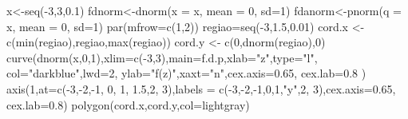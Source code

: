 \documentclass[
  letterpaper,
  DIV=11,
  numbers=noendperiod]{scrartcl}
\newenvironment{Shaded}{\begin{snugshade}}{\end{snugshade}}
\newcommand{\AttributeTok}[1]{\textcolor[rgb]{0.40,0.45,0.13}{#1}}
\newcommand{\DecValTok}[1]{\textcolor[rgb]{0.68,0.00,0.00}{#1}}
\newcommand{\FloatTok}[1]{\textcolor[rgb]{0.68,0.00,0.00}{#1}}
\newcommand{\FunctionTok}[1]{\textcolor[rgb]{0.28,0.35,0.67}{#1}}
\newcommand{\NormalTok}[1]{\textcolor[rgb]{0.00,0.23,0.31}{#1}}
\newcommand{\OtherTok}[1]{\textcolor[rgb]{0.00,0.23,0.31}{#1}}
\newcommand{\SpecialCharTok}[1]{\textcolor[rgb]{0.37,0.37,0.37}{#1}}
\newcommand{\StringTok}[1]{\textcolor[rgb]{0.13,0.47,0.30}{#1}}
\begin{document}
\begin{Shaded}
\begin{Highlighting}[]
\NormalTok{x}\OtherTok{\textless{}{-}}\FunctionTok{seq}\NormalTok{(}\SpecialCharTok{{-}}\DecValTok{3}\NormalTok{,}\DecValTok{3}\NormalTok{,}\FloatTok{0.1}\NormalTok{) }
\NormalTok{fdnorm}\OtherTok{\textless{}{-}}\FunctionTok{dnorm}\NormalTok{(}\AttributeTok{x =}\NormalTok{ x, }\AttributeTok{mean =} \DecValTok{0}\NormalTok{, }\AttributeTok{sd=}\DecValTok{1}\NormalTok{)   }
\NormalTok{fdanorm}\OtherTok{\textless{}{-}}\FunctionTok{pnorm}\NormalTok{(}\AttributeTok{q =}\NormalTok{ x, }\AttributeTok{mean =} \DecValTok{0}\NormalTok{, }\AttributeTok{sd=}\DecValTok{1}\NormalTok{)}
\FunctionTok{par}\NormalTok{(}\AttributeTok{mfrow=}\FunctionTok{c}\NormalTok{(}\DecValTok{1}\NormalTok{,}\DecValTok{2}\NormalTok{))}
\NormalTok{regiao}\OtherTok{=}\FunctionTok{seq}\NormalTok{(}\SpecialCharTok{{-}}\DecValTok{3}\NormalTok{,}\FloatTok{1.5}\NormalTok{,}\FloatTok{0.01}\NormalTok{)}
\NormalTok{cord.x }\OtherTok{\textless{}{-}} \FunctionTok{c}\NormalTok{(}\FunctionTok{min}\NormalTok{(regiao),regiao,}\FunctionTok{max}\NormalTok{(regiao))}
\NormalTok{cord.y }\OtherTok{\textless{}{-}} \FunctionTok{c}\NormalTok{(}\DecValTok{0}\NormalTok{,}\FunctionTok{dnorm}\NormalTok{(regiao),}\DecValTok{0}\NormalTok{) }
\FunctionTok{curve}\NormalTok{(}\FunctionTok{dnorm}\NormalTok{(x,}\DecValTok{0}\NormalTok{,}\DecValTok{1}\NormalTok{),}\AttributeTok{xlim=}\FunctionTok{c}\NormalTok{(}\SpecialCharTok{{-}}\DecValTok{3}\NormalTok{,}\DecValTok{3}\NormalTok{),}\AttributeTok{main=}\StringTok{\textquotesingle{}f.d.p\textquotesingle{}}\NormalTok{,}\AttributeTok{xlab=}\StringTok{"z"}\NormalTok{,}\AttributeTok{type=}\StringTok{"l"}\NormalTok{,}
      \AttributeTok{col=}\StringTok{"darkblue"}\NormalTok{,}\AttributeTok{lwd=}\DecValTok{2}\NormalTok{, }\AttributeTok{ylab=}\StringTok{"f(z)"}\NormalTok{,}\AttributeTok{xaxt=}\StringTok{"n"}\NormalTok{,}\AttributeTok{cex.axis=}\FloatTok{0.65}\NormalTok{, }\AttributeTok{cex.lab=}\FloatTok{0.8}\NormalTok{ ) }
\FunctionTok{axis}\NormalTok{(}\DecValTok{1}\NormalTok{,}\AttributeTok{at=}\FunctionTok{c}\NormalTok{(}\SpecialCharTok{{-}}\DecValTok{3}\NormalTok{,}\SpecialCharTok{{-}}\DecValTok{2}\NormalTok{,}\SpecialCharTok{{-}}\DecValTok{1}\NormalTok{, }\DecValTok{0}\NormalTok{, }\DecValTok{1}\NormalTok{, }\FloatTok{1.5}\NormalTok{,}\DecValTok{2}\NormalTok{, }\DecValTok{3}\NormalTok{),}\AttributeTok{labels =}
       \FunctionTok{c}\NormalTok{(}\SpecialCharTok{{-}}\DecValTok{3}\NormalTok{,}\SpecialCharTok{{-}}\DecValTok{2}\NormalTok{,}\SpecialCharTok{{-}}\DecValTok{1}\NormalTok{,}\DecValTok{0}\NormalTok{,}\DecValTok{1}\NormalTok{,}\StringTok{"y"}\NormalTok{,}\DecValTok{2}\NormalTok{, }\DecValTok{3}\NormalTok{),}\AttributeTok{cex.axis=}\FloatTok{0.65}\NormalTok{, }\AttributeTok{cex.lab=}\FloatTok{0.8}\NormalTok{) }
\FunctionTok{polygon}\NormalTok{(cord.x,cord.y,}\AttributeTok{col=}\StringTok{\textquotesingle{}lightgray\textquotesingle{}}\NormalTok{)}


\end{Highlighting}
\end{Shaded}
\end{document}
